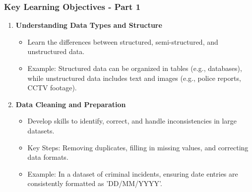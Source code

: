 \documentclass[aspectratio=169]{beamer}
\begin{document}
\begin{frame}[fragile]
    \frametitle{Key Learning Objectives - Part 1}
    \begin{enumerate}
        \item \textbf{Understanding Data Types and Structure}
        \begin{itemize}
            \item Learn the differences between structured, semi-structured, and unstructured data. 
            \item Example: Structured data can be organized in tables (e.g., databases), while unstructured data includes text and images (e.g., police reports, CCTV footage).
        \end{itemize}
        
        \item \textbf{Data Cleaning and Preparation}
        \begin{itemize}
            \item Develop skills to identify, correct, and handle inconsistencies in large datasets.
            \item Key Steps: Removing duplicates, filling in missing values, and correcting data formats.
            \item Example: In a dataset of criminal incidents, ensuring date entries are consistently formatted as 'DD/MM/YYYY'.
        \end{itemize}
    \end{enumerate}
\end{frame}
\end{document}
